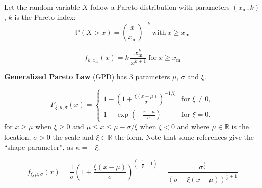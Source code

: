 


\begin{f}
Let the random variable \(X\) follow a Pareto distribution with parameters \((x_{\mathrm{m}},k)\), \(k\) is the Pareto index:
\[
\mathbb{P}(X>x)=\left(\frac{x}{x_{\mathrm{m}}}\right)^{-k}\ \mbox{with}\ x \geq x_{\mathrm{m}} 
\]


\[
f_{k,x_\mathrm{m}}(x) = k\,\frac{x_\mathrm{m}^k}{x^{k+1}}\ \mbox{for}\ x \ge x_\mathrm{m}
\]

\textbf{	Generalized Pareto Law} (GPD) has 3 parameters \(\mu\), \(\sigma\) and \(\xi\).


\[
F_{\xi,\mu,\sigma}(x) = \begin{cases} 1 - \left(1+ \frac{\xi(x-\mu)}{\sigma}\right)^{-1/\xi} & \text{for }\xi \neq 0, \\ 1 - \exp \left(-\frac{x-\mu}{\sigma}\right) & \text{for }\xi = 0. \end{cases} 
\]
for  \(x \geq \mu\)  when \(\xi \geq 0\)  and \( \mu \leq x \leq \mu - \sigma /\xi\)  when \( \xi < 0\) and where \(\mu\in\mathbb{R}\) is the location, \(\sigma>0\) the scale and  \(\xi\in\mathbb{R}\) the form. 
Note that some references give the \enquote{shape parameter}, as \(\kappa = - \xi\).

\[
f_{\xi,\mu,\sigma}(x) = \frac{1}{\sigma}\left(1 + \frac{\xi (x-\mu)}{\sigma}\right)^{\left(-\frac{1}{\xi} - 1\right)}
=
 \frac{\sigma^{\frac{1}{\xi}}}{\left(\sigma + \xi (x-\mu)\right)^{\frac{1}{\xi}+1}}
\]

\medskip

\begin{center}
		


\end{center}
\end{f}
